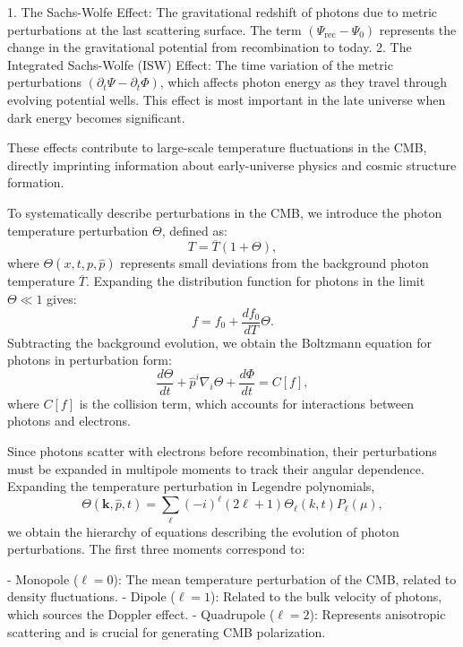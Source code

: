 \documentclass{aa}
\begin{document}
1. The Sachs-Wolfe Effect: The gravitational redshift of photons due to metric perturbations at the last scattering surface. The term $(\Psi_{\text{rec}} - \Psi_0)$ represents the change in the gravitational potential from recombination to today.
2. The Integrated Sachs-Wolfe (ISW) Effect: The time variation of the metric perturbations $(\partial_t \Psi - \partial_t \Phi)$, which affects photon energy as they travel through evolving potential wells. This effect is most important in the late universe when dark energy becomes significant.

These effects contribute to large-scale temperature fluctuations in the CMB, directly imprinting information about early-universe physics and cosmic structure formation.

To systematically describe perturbations in the CMB, we introduce the photon temperature perturbation $\Theta$, defined as:
\begin{equation}
T = \overline{T} (1 + \Theta),
\end{equation}
where $\Theta(x, t, p, \hat{p})$ represents small deviations from the background photon temperature $\overline{T}$. Expanding the distribution function for photons in the limit $\Theta \ll 1$ gives:
\begin{equation}
f = f_0 + \frac{df_0}{dT} \Theta.
\end{equation}
Subtracting the background evolution, we obtain the Boltzmann equation for photons in perturbation form:
\begin{equation}
\frac{d\Theta}{dt} + \hat{p}^i \nabla_i \Theta + \frac{d\Phi}{dt} = C[f],
\end{equation}
where $C[f]$ is the collision term, which accounts for interactions between photons and electrons.

Since photons scatter with electrons before recombination, their perturbations must be expanded in multipole moments to track their angular dependence. Expanding the temperature perturbation in Legendre polynomials,
\begin{equation}
\Theta(\mathbf{k}, \hat{p}, t) = \sum_{\ell} (-i)^\ell (2\ell + 1) \Theta_\ell (k, t) P_\ell(\mu),
\end{equation}
we obtain the hierarchy of equations describing the evolution of photon perturbations. The first three moments correspond to:

- Monopole ($\ell = 0$): The mean temperature perturbation of the CMB, related to density fluctuations.
- Dipole ($\ell = 1$): Related to the bulk velocity of photons, which sources the Doppler effect.
- Quadrupole ($\ell = 2$): Represents anisotropic scattering and is crucial for generating CMB polarization.
\end{document}
